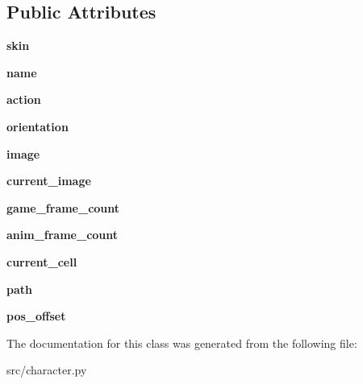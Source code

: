 \subsection*{Public Attributes}
\begin{DoxyCompactItemize}
\item 
\hypertarget{classsrc_1_1character_1_1_character_a9471c88e7fad959e6477b8c776639fde}{}\label{classsrc_1_1character_1_1_character_a9471c88e7fad959e6477b8c776639fde} 
{\bfseries skin}
\item 
\hypertarget{classsrc_1_1character_1_1_character_ac54e84495d7978ad20277857cc2be8cd}{}\label{classsrc_1_1character_1_1_character_ac54e84495d7978ad20277857cc2be8cd} 
{\bfseries name}
\item 
\hypertarget{classsrc_1_1character_1_1_character_af20a9e814a18e169b70efa9f1a9c1d5c}{}\label{classsrc_1_1character_1_1_character_af20a9e814a18e169b70efa9f1a9c1d5c} 
{\bfseries action}
\item 
\hypertarget{classsrc_1_1character_1_1_character_a29375f9b3c040a724b5ce91efa01b0c3}{}\label{classsrc_1_1character_1_1_character_a29375f9b3c040a724b5ce91efa01b0c3} 
{\bfseries orientation}
\item 
\hypertarget{classsrc_1_1character_1_1_character_a70d3c2ae8d224038d0232074b415fda3}{}\label{classsrc_1_1character_1_1_character_a70d3c2ae8d224038d0232074b415fda3} 
{\bfseries image}
\item 
\hypertarget{classsrc_1_1character_1_1_character_a3c1929c1997cebcd16448e140ac5f908}{}\label{classsrc_1_1character_1_1_character_a3c1929c1997cebcd16448e140ac5f908} 
{\bfseries current\+\_\+image}
\item 
\hypertarget{classsrc_1_1character_1_1_character_a797e3769df707a703659cb59166f1119}{}\label{classsrc_1_1character_1_1_character_a797e3769df707a703659cb59166f1119} 
{\bfseries game\+\_\+frame\+\_\+count}
\item 
\hypertarget{classsrc_1_1character_1_1_character_a42c7b2470087058b4596a95e103d28dc}{}\label{classsrc_1_1character_1_1_character_a42c7b2470087058b4596a95e103d28dc} 
{\bfseries anim\+\_\+frame\+\_\+count}
\item 
\hypertarget{classsrc_1_1character_1_1_character_a75e73a69a020b7544fdbf218cfd44723}{}\label{classsrc_1_1character_1_1_character_a75e73a69a020b7544fdbf218cfd44723} 
{\bfseries current\+\_\+cell}
\item 
\hypertarget{classsrc_1_1character_1_1_character_a15636a6d101330891524cca1acc7d2fb}{}\label{classsrc_1_1character_1_1_character_a15636a6d101330891524cca1acc7d2fb} 
{\bfseries path}
\item 
\hypertarget{classsrc_1_1character_1_1_character_a78131da2c9dfd5d6d57a3d869191eda2}{}\label{classsrc_1_1character_1_1_character_a78131da2c9dfd5d6d57a3d869191eda2} 
{\bfseries pos\+\_\+offset}
\end{DoxyCompactItemize}


The documentation for this class was generated from the following file\+:\begin{DoxyCompactItemize}
\item 
src/character.\+py\end{DoxyCompactItemize}
